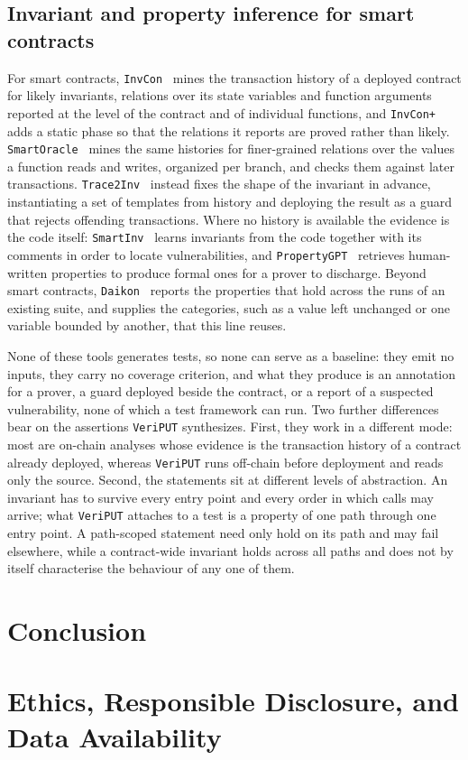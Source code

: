 \documentclass[manuscript,anonymous]{acmart}
\newcommand{\tool}[1]{\texttt{#1}}
\begin{document}
\subsection{Invariant and property inference for smart contracts}\label{sec:rw-inv}

For smart contracts, \tool{InvCon}~\cite{InvCon2022} mines the transaction
history of a deployed contract for likely invariants, relations over its state
variables and function arguments reported at the level of the contract and of
individual functions, and \tool{InvCon+}~\cite{InvConPlus2024} adds a static
phase so that the relations it reports are proved rather than likely.
\tool{SmartOracle}~\cite{SmartOracle2025} mines the same histories for
finer-grained relations over the values a function reads and writes, organized
per branch, and checks them against later transactions.
\tool{Trace2Inv}~\cite{Trace2Inv2024} instead fixes the shape of the invariant
in advance, instantiating a set of templates from history and deploying the
result as a guard that rejects offending transactions. Where no history is
available the evidence is the code itself: \tool{SmartInv}~\cite{SmartInv2024}
learns invariants from the code together with its comments in order to locate
vulnerabilities, and \tool{PropertyGPT}~\cite{PropertyGPT2025} retrieves
human-written properties to produce formal ones for a prover to discharge.
Beyond smart contracts, \tool{Daikon}~\cite{Daikon2007} reports the properties
that hold across the runs of an existing suite, and supplies the categories,
such as a value left unchanged or one variable bounded by another, that this
line reuses.

None of these tools generates tests, so none can serve as a baseline: they emit
no inputs, they carry no coverage criterion, and what they produce is an
annotation for a prover, a guard deployed beside the contract, or a report of a
suspected vulnerability, none of which a test framework can run. Two further
differences bear on the assertions \tool{VeriPUT} synthesizes. First, they work
in a different mode: most are on-chain analyses whose evidence is the
transaction history of a contract already deployed, whereas \tool{VeriPUT} runs
off-chain before deployment and reads only the source. Second, the statements
sit at different levels of abstraction. An invariant has to survive every entry
point and every order in which calls may arrive; what \tool{VeriPUT} attaches to
a test is a property of one path through one entry point. A path-scoped
statement need only hold on its path and may fail elsewhere, while a
contract-wide invariant holds across all paths and does not by itself
characterise the behaviour of any one of them.

\section{Conclusion}\label{sec:conclusion}

\section{Ethics, Responsible Disclosure, and Data Availability}



\end{document}
